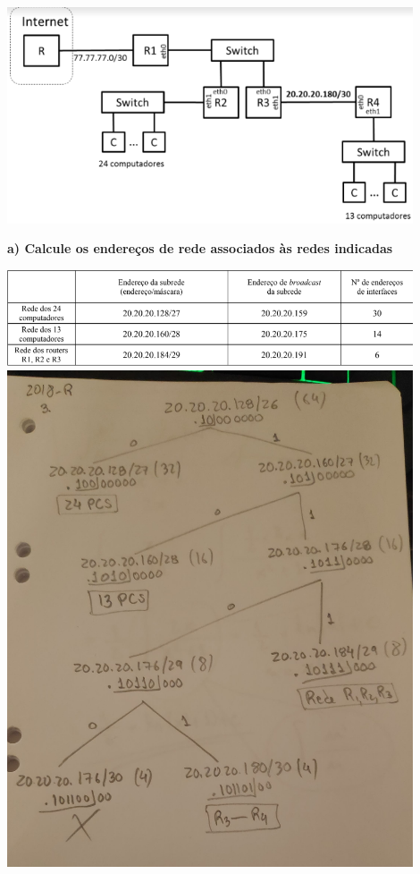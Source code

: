 \documentclass[../resumosRCOM.tex]{subfiles}
\begin{document}
\begin{center}
    \includegraphics[width=12cm]{images/RCOM40.png}
\end{center}
\textbf{a) Calcule os endereços de rede associados às redes indicadas}
\begin{center}
    \includegraphics[width=12cm]{images/RCOM41.png}
    \includegraphics[width=12cm]{images/RCOM55.jpg}
\end{center}
\end{document}
